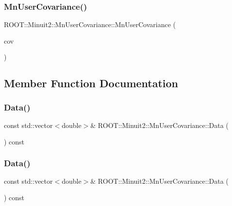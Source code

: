 \subsubsection{\texorpdfstring{MnUserCovariance()}{MnUserCovariance()}\hspace{0.1cm}{\footnotesize\ttfamily [12/12]}}
{\footnotesize\ttfamily R\+O\+O\+T\+::\+Minuit2\+::\+Mn\+User\+Covariance\+::\+Mn\+User\+Covariance (\begin{DoxyParamCaption}\item[{const \mbox{\hyperlink{classROOT_1_1Minuit2_1_1MnUserCovariance}{Mn\+User\+Covariance}} \&}]{cov }\end{DoxyParamCaption})\hspace{0.3cm}{\ttfamily [inline]}}



\subsection{Member Function Documentation}
\mbox{\label{classROOT_1_1Minuit2_1_1MnUserCovariance_a796819e63a5a1a80373a7be0cd764f2e}} 
\subsubsection{\texorpdfstring{Data()}{Data()}\hspace{0.1cm}{\footnotesize\ttfamily [1/3]}}
{\footnotesize\ttfamily const std\+::vector$<$double$>$\& R\+O\+O\+T\+::\+Minuit2\+::\+Mn\+User\+Covariance\+::\+Data (\begin{DoxyParamCaption}{ }\end{DoxyParamCaption}) const\hspace{0.3cm}{\ttfamily [inline]}}

\mbox{\label{classROOT_1_1Minuit2_1_1MnUserCovariance_a796819e63a5a1a80373a7be0cd764f2e}} 
\subsubsection{\texorpdfstring{Data()}{Data()}\hspace{0.1cm}{\footnotesize\ttfamily [2/3]}}
{\footnotesize\ttfamily const std\+::vector$<$double$>$\& R\+O\+O\+T\+::\+Minuit2\+::\+Mn\+User\+Covariance\+::\+Data (\begin{DoxyParamCaption}{ }\end{DoxyParamCaption}) const\hspace{0.3cm}{\ttfamily [inline]}}

